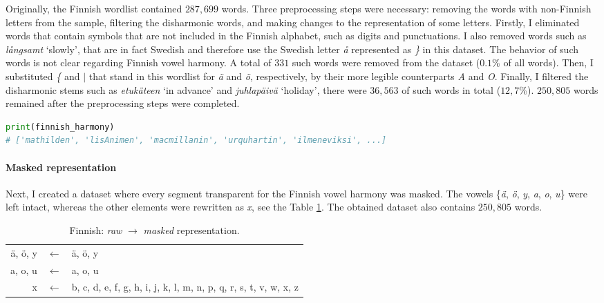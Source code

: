Originally, the Finnish wordlist contained $287,699$ words.
Three preprocessing steps were necessary: removing the words with non-Finnish letters from the sample, filtering the disharmonic words, and making changes to the representation of some letters.
Firstly, I eliminated words that contain symbols that are not included in the Finnish alphabet, such as digits and punctuations.
I also removed words such as \emph{l\r{a}ngsamt} `slowly', that are in fact Swedish and therefore use the Swedish letter \emph{\r{a}} represented as \emph{\}} in this dataset.
The behavior of such words is not clear regarding Finnish vowel harmony.
A total of $331$ such words were removed from the dataset ($0.1$\% of all words).
Then, I substituted \emph{\{} and \emph{$\mid$} that stand in this wordlist for \emph{\"a} and \emph{\"o}, respectively, by their more legible counterparts \emph{A} and \emph{O}.
Finally, I filtered the disharmonic stems such as \emph{etuk\"ateen} `in advance' and \emph{juhlap\"aiv\"a} `holiday', there were $36,563$ of such words in total ($12,7$\%).
$250,805$ words remained after the preprocessing steps were completed.

\begin{lstlisting}[language=Python]
print(finnish_harmony)
# ['mathilden', 'lisAnimen', 'macmillanin', 'urquhartin', 'ilmeneviksi', ...]
\end{lstlisting}


\paragraph{Masked representation}

Next, I created a dataset where every segment transparent for the Finnish vowel harmony was masked.
The vowels \{\emph{\"a}, \emph{\"o}, \emph{y}, \emph{a}, \emph{o}, \emph{u}\} were left intact, whereas the other elements were rewritten as \emph{x}, see the Table \ref{finnishmap1}.
The obtained dataset also contains $250,805$ words.

\begin{table}[h!]
\begin{center}
\begin{tabular}{rcl}
\"a, \"o, y & $\leftarrow$ & \"a, \"o, y \\
a, o, u & $\leftarrow$ & a, o, u \\
x & $\leftarrow$ & b, c, d, e, f, g, h, i, j, k, l, m, n, p, q, r, s, t, v, w, x, z
\end{tabular}
\end{center}
\caption{Finnish: \emph{raw} $\rightarrow$ \emph{masked} representation.}
\label{finnishmap1}
\end{table}

